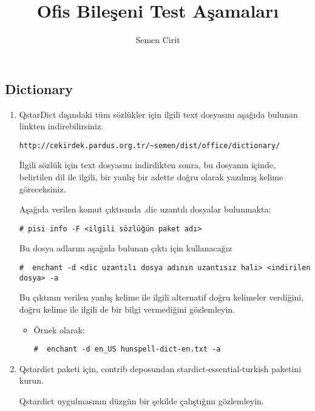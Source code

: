 \documentclass[a4paper,10pt]{article}
\title{Ofis Bileşeni Test Aşamaları}
\author{Semen Cirit}
\begin{document}
\maketitle
\subsection*{Dictionary}
\begin{enumerate}
 \item QstarDict dışındaki tüm sözlükler için ilgili text dosyasını aşağıda bulunan linkten indirebilirsiniz.
\begin{verbatim}
http://cekirdek.pardus.org.tr/~semen/dist/office/dictionary/
\end{verbatim}
İlgili sözlük için text dosyasını indirdikten sonra, bu dosyanın içinde, belirtilen dil ile ilgili, bir yanlış bir adette doğru olarak yazılmış kelime göreceksiniz.

Aşağıda verilen komut çıktısında .dic uzantılı dosyalar bulunmakta:
\begin{verbatim}
# pisi info -F <ilgili sözlüğün paket adı> 
\end{verbatim}

Bu dosya adlarını aşağıda bulunan çıktı için kullanacağız
\begin{verbatim}
#  enchant -d <dic uzantılı dosya adının uzantısız hali> <indirilen dosya> -a
\end{verbatim}

Bu çıktının verilen yanlış kelime ile ilgili alternatif doğru kelimeler verdiğini, doğru kelime ile ilgili de bir bilgi vermediğini gözlemleyin.

\begin{itemize}
 \item Örnek olarak: 
\begin{verbatim}
#  enchant -d en_US hunspell-dict-en.txt -a
\end{verbatim}

\end{itemize}
 \item Qstardict paketi için, contrib deposundan stardict-essential-turkish paketini kurun.

	Qstardict uygulmasının düzgün bir şekilde çalıştığını gözlemleyin.
\end{enumerate}
\end{document}
